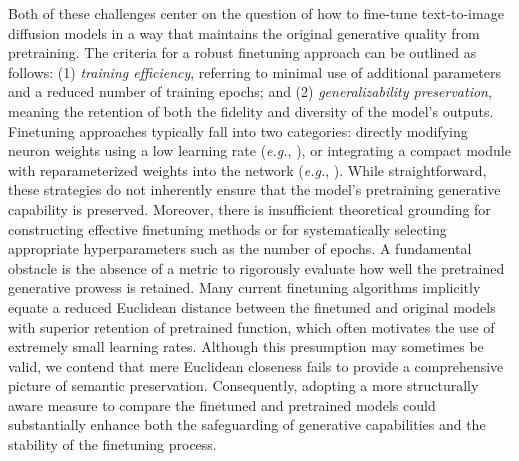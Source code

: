 Both of these challenges center on the question of how to fine-tune text-to-image diffusion models in a way that maintains the original generative quality from pretraining. The criteria for a robust finetuning approach can be outlined as follows: (1) \emph{training efficiency}, referring to minimal use of additional parameters and a reduced number of training epochs; and (2) \emph{generalizability preservation}, meaning the retention of both the fidelity and diversity of the model’s outputs. Finetuning approaches typically fall into two categories: directly modifying neuron weights using a low learning rate (\emph{e.g.}, \cite{ruiz2023dreambooth}), or integrating a compact module with reparameterized weights into the network (\emph{e.g.}, \cite{hulora2022,zhang2023adding}). While straightforward, these strategies do not inherently ensure that the model’s pretraining generative capability is preserved. Moreover, there is insufficient theoretical grounding for constructing effective finetuning methods or for systematically selecting appropriate hyperparameters such as the number of epochs. A fundamental obstacle is the absence of a metric to rigorously evaluate how well the pretrained generative prowess is retained. Many current finetuning algorithms implicitly equate a reduced Euclidean distance between the finetuned and original models with superior retention of pretrained function, which often motivates the use of extremely small learning rates. Although this presumption may sometimes be valid, we contend that mere Euclidean closeness fails to provide a comprehensive picture of semantic preservation. Consequently, adopting a more structurally aware measure to compare the finetuned and pretrained models could substantially enhance both the safeguarding of generative capabilities and the stability of the finetuning process.

